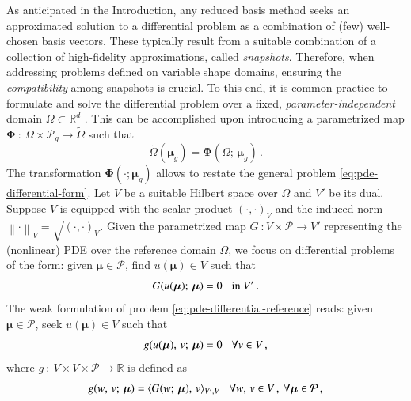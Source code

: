 \documentclass{elsarticle}
\numberwithin{equation}{section}
\theoremstyle{theorem}
\theoremstyle{definition}
\theoremstyle{remark}
\theoremstyle{proposition}
\numberwithin{figure}{section}
\newcommand{\norm}[1]{\left\lVert#1\right\rVert}
\newcommand{\wt}[1]{\widetilde{#1}}
\newcommand{\bg}[1]{\boldsymbol{#1}}
\begin{document}
		As anticipated in the Introduction, any reduced basis method seeks an approximated solution to a differential problem as a combination of (few) well-chosen basis vectors. These typically result from a suitable combination of a collection of high-fidelity approximations, called \emph{snapshots}. Therefore, when addressing problems defined on variable shape domains, ensuring the \emph{compatibility} among snapshots is crucial. To this end, it is common practice to formulate and solve the differential problem over a fixed, \emph{parameter-independent} domain $\Omega \subset \mathbb{R}^d$ \cite{MN16}. This can be accomplished upon introducing a parametrized map $\bg{\Phi} ~ : ~ \Omega \times \mathcal{P}_g \rightarrow \wt{\Omega}$ such that
		\begin{equation*}
			\label{eq:parametrized-map}
			\wt{\Omega}(\bg{\mu}_g) = \bg{\Phi}(\Omega; \, \bg{\mu}_g) \, .
		\end{equation*}
		The transformation $\bg{\Phi}(\cdot; \bg{\mu}_g)$ allows to restate the general problem \eqref{eq:pde-differential-form}. Let $V$ be a suitable Hilbert space over $\Omega$ and $V'$ be its dual. Suppose $V$ is equipped with the scalar product $(\cdot, \cdot)_V$ and the induced norm $\norm{\cdot}_V = \sqrt{(\cdot, \cdot)_V}$. Given the parametrized map $G ~ : V \times \mathcal{P} \rightarrow V'$ representing the (nonlinear) PDE over the reference domain $\Omega$, we focus on differential problems of the form: given $\bg{\mu} \in \mathcal{P}$, find $u(\bg{\mu}) \in V$ such that
		\begin{equation}
			\label{eq:pde-differential-reference}
			G(u(\bg{\mu}); \, \bg{\mu}) = 0 \hspace*{0.3cm} \text{in $V'$} \, .
		\end{equation}
		The weak formulation of problem \eqref{eq:pde-differential-reference} reads: given $\bg{\mu} \in \mathcal{P}$, seek $u(\bg{\mu}) \in V$ such that
		\begin{equation}
			\label{eq:pde-weak-reference}
			g(u(\bg{\mu}), \, v; \, \bg{\mu}) = 0 \hspace*{0.3cm} \forall v \in V \, ,
		\end{equation}
		where $g ~ : ~ V \times V \times \mathcal{P} \rightarrow \mathbb{R}$ is defined as
		\begin{equation*}
			g(w, \, v; \, \bg{\mu}) = \langle G(w; \, \bg{\mu}), \, v \rangle_{V',V} \hspace*{0.3cm} \forall w, \, v \in V \, , ~ \forall \bg{\mu} \in \mathcal{P} \, ,
		\end{equation*}
\end{document}
